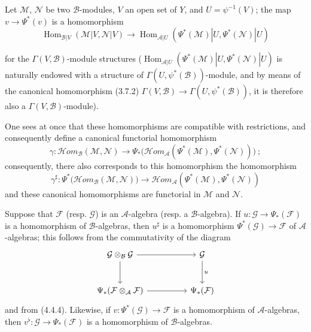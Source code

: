 \begin{env}[4.4.6]
\label{0.4.4.6}
Let $\mathcal{M}$, $\mathcal{N}$ be two $\mathcal{B}$-modules, $V$ an open set
of $Y$, and $U=\psi^{-1}(V)$; the map $v\to\Psi^*(v)$ is a
homomorphism
\[
  \operatorname{Hom}_{\mathcal{B}|V}(\mathcal{M}|V,\mathcal{N}|V)
  \longrightarrow
  \operatorname{Hom}_{\mathcal{A}|U}
  (\Psi^*(\mathcal{M})|U,\Psi^*(\mathcal{N})|U)
\]
\begin{sloppypar}
for the $\Gamma(V,\mathcal{B})$-module structures
($\operatorname{Hom}_{\mathcal{A}|U}
(\Psi^*(\mathcal{M})|U,\allowbreak\Psi^*(\mathcal{N})|U)$ is naturally endowed with a
structure of $\Gamma(U,\psi^*(\mathcal{B}))$-module, and by means of the
canonical homomorphism
(3.7.2)
$\Gamma(V,\mathcal{B})\to\Gamma(U,\psi^*(\mathcal{B}))$, it is therefore also a
$\Gamma(V,\mathcal{B})$-module).
\end{sloppypar}
One sees at once that these homomorphisms are
compatible with restrictions, and consequently define a canonical
functorial homomorphism
\[
  \gamma:\mathcal{H}\!om_{\mathcal{B}}(\mathcal{M},\mathcal{N})
  \longrightarrow
  \Psi_*\bigl(\mathcal{H}\!om_{\mathcal{A}}
  (\Psi^*(\mathcal{M}),\Psi^*(\mathcal{N}))\bigr)~;
\]
consequently, there also corresponds to this homomorphism the homomorphism
\[
  \gamma^\sharp:
  \Psi^*\bigl(\mathcal{H}\!om_{\mathcal{B}}(\mathcal{M},\mathcal{N})\bigr)
  \longrightarrow
  \mathcal{H}\!om_{\mathcal{A}}
  (\Psi^*(\mathcal{M}),\Psi^*(\mathcal{N}))
\]
and these canonical homomorphisms are functorial in $\mathcal{M}$ and
$\mathcal{N}$.
\end{env}

\begin{env}[4.4.7]
\label{0.4.4.7}
Suppose that $\mathcal{F}$ (resp. $\mathcal{G}$) is an
$\mathcal{A}$-algebra (resp. a $\mathcal{B}$-algebra). If
$u:\mathcal{G}\to\Psi_*(\mathcal{F})$ is a homomorphism of
$\mathcal{B}$-algebras, then $u^\sharp$ is a homomorphism
$\Psi^*(\mathcal{G})\to\mathcal{F}$ of $\mathcal{A}$-algebras; this follows
from the commutativity of the diagram
\[
\begin{tikzcd}[column sep=huge,row sep=large]
\mathcal{G}\otimes_{\mathcal{B}}\mathcal{G}
  \arrow[r] \arrow[d]
  & \mathcal{G} \arrow[d,"u"] \\
\Psi_*(\mathcal{F}\otimes_{\mathcal{A}}\mathcal{F})
  \arrow[r]
  & \Psi_*(\mathcal{F})
\end{tikzcd}
\]
and from (4.4.4). Likewise, if $v:\Psi^*(\mathcal{G})\to\mathcal{F}$ is a
homomorphism of $\mathcal{A}$-algebras, then
$v^\flat:\mathcal{G}\to\Psi_*(\mathcal{F})$ is a homomorphism of
$\mathcal{B}$-algebras.
\end{env}

